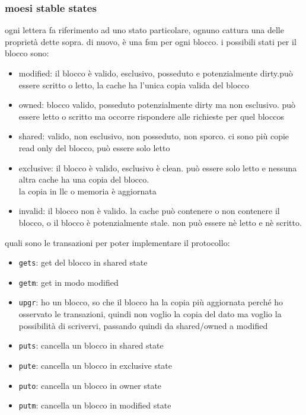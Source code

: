 \documentclass[12pt, oneside]{extbook} %
\begin{document}
\subsubsection{moesi stable states}
ogni lettera fa riferimento ad uno stato particolare, ognuno cattura una delle proprietà dette sopra. di nuovo, è una fsm per ogni blocco. i possibili stati per il blocco sono:
\begin{itemize}
\item modified: il blocco è valido, esclusivo, posseduto e potenzialmente dirty.può essere scritto o letto, la cache ha l'unica copia valida del blocco
\item owned: blocco valido, posseduto potenzialmente dirty ma non esclusivo. può essere letto o scritto ma occorre rispondere alle richieste per quel bloccos
\item shared: valido, non esclusivo, non posseduto, non sporco. ci sono più copie read only del blocco, può essere solo letto
\item exclusive: il blocco è valido, esclusivo è clean. può essere solo letto e nessuna altra cache ha una copia del blocco.\\la copia in llc o memoria è aggiornata
\item invalid: il blocco non è valido. la cache può contenere o non contenere il blocco, o il blocco è potenzialmente stale. non può essere nè letto e nè scritto.
\end{itemize}
quali sono le transazioni per poter implementare il protocollo:
\begin{itemize}
\item \texttt{gets}: get del blocco in shared state
\item \texttt{getm}: get in modo modified
\item \texttt{upgr}: ho un blocco, so che il blocco ha la copia più aggiornata perché ho osservato le transazioni, quindi non voglio la copia del dato ma voglio la possibilità di scrivervi, passando quindi da shared/owned a modified
\item \texttt{puts}: cancella un blocco in shared state
\item \texttt{pute}: cancella un blocco in exclusive state
\item \texttt{puto}: cancella un blocco in owner state
\item \texttt{putm}: cancella un blocco in modified state
\end{itemize}
\end{document}
